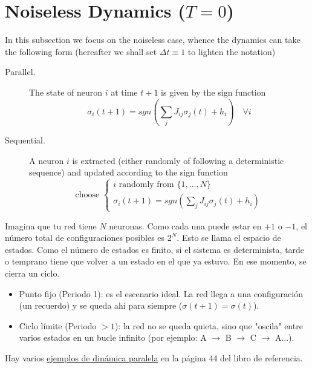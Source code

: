 \section{Noiseless Dynamics ($T=0$)}

In this subsection we focus on the noiseless case, whence the dynamics can take the
following form (hereafter we shall set $\Delta t\equiv 1$ to lighten the notation)

\begin{description}
    \item[Parallel.] The state of neuron $i$ at time $t + 1$ is given by the sign function
    \begin{equation*}
        \sigma_i (t + 1) = sgn\left(\sum_{j} J_{ij} \sigma_j (t) + h_i\right) \quad \forall i
    \end{equation*}
    \item[Sequential.] A neuron $i$ is extracted (either randomly of following a deterministic sequence) and updated according to the sign function
    \begin{equation*}
        \text{choose } \left\{ \begin{array}{l}
            i \text{ randomly from } \{1, \ldots, N \} \\
            \sigma_i(t + 1) = sgn\left(\sum_{j} J_{ij} \sigma_j (t) + h_i\right)
        \end{array} \right.
    \end{equation*} 
\end{description}
\noindent
Imagina que tu red tiene $N$ neuronas. Como cada una puede estar en $+1$ o $-1$, el número total de configuraciones posibles es $2^N$. Esto se llama el espacio de estados. Como el número de estados es finito, si el sistema es determinista, tarde o temprano tiene que volver a un estado en el que ya estuvo. En ese momento, se cierra un ciclo.

\begin{itemize}
    \item Punto fijo (Periodo 1): es el escenario ideal. La red llega a una configuración (un recuerdo) y se queda ahí para siempre ($\sigma(t+1) = \sigma(t)$).
    \item Ciclo límite (Periodo $> 1$): la red no se queda quieta, sino que "oscila" entre varios estados en un bucle infinito (por ejemplo: A $\to$ B $\to$ C $\to$ A...).
\end{itemize}

Hay varios \underline{ejemplos de dinámica paralela} en la página 44 del libro de referencia.


